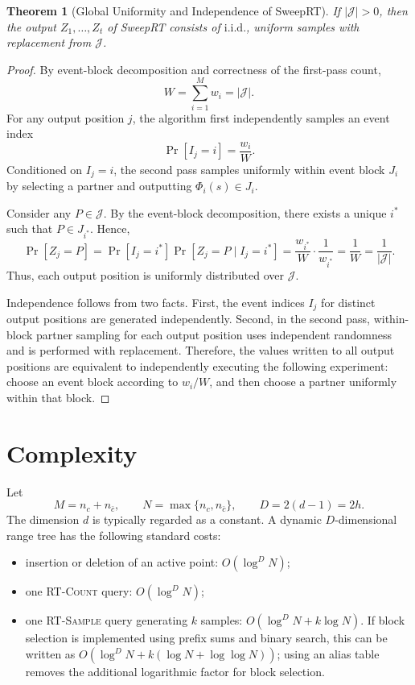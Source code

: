 \documentclass[11pt]{article}
\newtheorem{theorem}{Theorem}[section]
\newcommand{\J}{\mathcal J}
\newcommand{\iid}{\mathrm{i.i.d.}}
\begin{document}
\begin{theorem}[Global Uniformity and Independence of SweepRT]
If \(|\J|>0\), then the output \(Z_1,\ldots,Z_t\) of SweepRT consists of \(\iid\), uniform samples with replacement from \(\J\).
\end{theorem}

\begin{proof}
By event-block decomposition and correctness of the first-pass count,
\[
 W=\sum_{i=1}^{M}w_i=|\J|.
\]
For any output position \(j\), the algorithm first independently samples an event index
\[
 \Pr[I_j=i]=\frac{w_i}{W}.
\]
Conditioned on \(I_j=i\), the second pass samples uniformly within event block \(J_i\) by selecting a partner and outputting \(\Phi_i(s)\in J_i\).

Consider any \(P\in\J\). By the event-block decomposition, there exists a unique \(i^*\) such that \(P\in J_{i^*}\). Hence,
\[
 \Pr[Z_j=P]
 =\Pr[I_j=i^*]\Pr[Z_j=P\mid I_j=i^*]
 =\frac{w_{i^*}}{W}\cdot\frac1{w_{i^*}}
 =\frac1W
 =\frac1{|\J|}.
\]
Thus, each output position is uniformly distributed over \(\J\).

Independence follows from two facts. First, the event indices \(I_j\) for distinct output positions are generated independently. Second, in the second pass, within-block partner sampling for each output position uses independent randomness and is performed with replacement. Therefore, the values written to all output positions are equivalent to independently executing the following experiment: choose an event block according to \(w_i/W\), and then choose a partner uniformly within that block.
\end{proof}

\section{Complexity}

Let
\[
 M=n_c+n_{\bar c},
 \qquad
 N=\max\{n_c,n_{\bar c}\},
 \qquad
 D=2(d-1)=2h.
\]
The dimension \(d\) is typically regarded as a constant. A dynamic \(D\)-dimensional range tree has the following standard costs:
\begin{itemize}[leftmargin=2em]
  \item insertion or deletion of an active point: \(O(\log^D N)\);
  \item one \textsc{RT-Count} query: \(O(\log^D N)\);
  \item one \textsc{RT-Sample} query generating \(k\) samples: \(O(\log^D N+k\log N)\). If block selection is implemented using prefix sums and binary search, this can be written as \(O(\log^D N+k(\log N+\log\log N))\); using an alias table removes the additional logarithmic factor for block selection.
\end{itemize}
\end{document}
